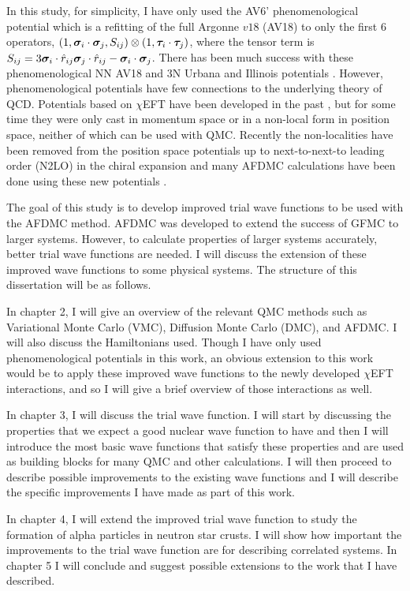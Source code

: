 In this study, for simplicity, I have only used the AV6' phenomenological potential which is a refitting of the full Argonne $v18$ (AV18) \cite{wiringa1995} to only the first 6 operators, $(1,\bm{\sigma}_i\cdot\bm{\sigma}_j,S_{ij})\otimes(1,\bm{\tau}_i\cdot\bm{\tau}_j)$, where the tensor term is $S_{ij} = 3\bm{\sigma}_i\cdot\hat{r}_{ij}\bm{\sigma}_j\cdot\hat{r}_{ij}-\bm{\sigma}_i\cdot\bm{\sigma}_j$. There has been much success with these phenomenological NN AV18 and 3N Urbana \cite{carlson1983} and Illinois potentials \cite{pieper2001}. However, phenomenological potentials have few connections to the underlying theory of QCD. Potentials based on $\chi$EFT have been developed in the past \cite{epelbaum2009}, but for some time they were only cast in momentum space or in a non-local form in position space, neither of which can be used with QMC. Recently the non-localities have been removed from the position space potentials up to next-to-next-to leading order (N2LO) in the chiral expansion and many AFDMC calculations have been done using these new potentials \cite{gezerlis2013}.

The goal of this study is to develop improved trial wave functions to be used with the AFDMC method. AFDMC was developed to extend the success of GFMC to larger systems. However, to calculate properties of larger systems accurately, better trial wave functions are needed. I will discuss the extension of these improved wave functions to some physical systems. The structure of this dissertation will be as follows.

In chapter 2, I will give an overview of the relevant QMC methods such as Variational Monte Carlo (VMC), Diffusion Monte Carlo (DMC), and AFDMC. I will also discuss the Hamiltonians used. Though I have only used phenomenological potentials in this work, an obvious extension to this work would be to apply these improved wave functions to the newly developed $\chi$EFT interactions, and so I will give a brief overview of those interactions as well.

In chapter 3, I will discuss the trial wave function. I will start by discussing the properties that we expect a good nuclear wave function to have and then I will introduce the most basic wave functions that satisfy these properties and are used as building blocks for many QMC and other calculations. I will then proceed to describe possible improvements to the existing wave functions and I will describe the specific improvements I have made as part of this work.

In chapter 4, I will extend the improved trial wave function to study the formation of alpha particles in neutron star crusts. I will show how important the improvements to the trial wave function are for describing correlated systems. In chapter 5 I will conclude and suggest possible extensions to the work that I have described.
